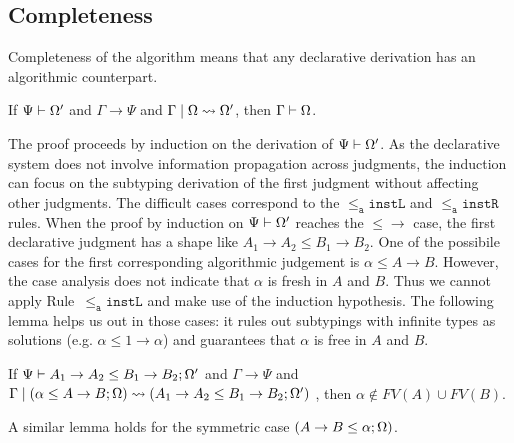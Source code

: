 
\subsection{Completeness}

Completeness of the algorithm means that any declarative derivation has an
algorithmic counterpart. 
\begin{theorem}[Completeness]
	If $\Psi\vdash \Omega'$ and $\Gamma \to \Psi$ and $\Gamma \mid \Omega\rightsquigarrow \Omega'$, then $\Gamma\vdash \Omega$.
\end{theorem}

The proof proceeds by induction on the derivation of $\Psi\vdash\Omega'$. As the
declarative system does not involve information propagation across judgments,
the induction can focus on the subtyping derivation of the first judgment
without affecting other judgments.
The difficult cases correspond to the $\mathtt{{\le_a}instL}$ and
$\mathtt{{\le_a}instR}$ rules.  When the proof by induction on $\Psi\vdash
\Omega'$ reaches the $\mathtt{{\le}{\to}}$ case, the first declarative
judgment has a shape like $A_1\to A_2 \le B_1\to B_2$. 
One of the possibile cases for the first corresponding algorithmic judgement
is $\alpha\le A\to B$. However, the case analysis does not indicate
that $\alpha$ is fresh in $A$ and $B$. Thus we cannot apply
Rule~$\mathtt{{\le_a}instL}$ and make use of the induction hypothesis.
The following lemma helps us out in those cases:
it rules out subtypings with infinite types as solutions (e.g. $\alpha \le 1
\to \alpha$) and guarantees that $\alpha$ is free in $A$ and $B$.
\begin{lemma}
	If $\Psi \vdash A_1\to A_2 \le B_1\to B_2 ; \Omega'$ and $\Gamma\to \Psi$ and $\Gamma\mid (\alpha \le A\to B ; \Omega) \rightsquigarrow
	(A_1\to A_2 \le B_1\to B_2 ; \Omega')$
	, then $\alpha \notin FV(A)\cup FV(B)$. 
\end{lemma}
A similar lemma holds for the symmetric case $(A \to B \le \alpha ; \Omega)$.

